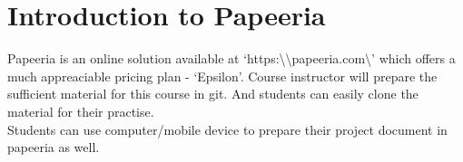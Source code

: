 \documentclass{article}
\begin{document}
\section{Introduction to Papeeria}
	Papeeria is an online solution available at `https:\textbackslash\textbackslash papeeria.com\textbackslash' which offers a much appreaciable pricing plan - `Epsilon'.
	Course instructor will prepare the sufficient material for this course in git.
	And students can easily clone the material for their practise.\\

	Students can use computer/mobile device to prepare their project document in papeeria as well.
\end{document}
